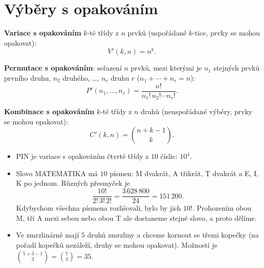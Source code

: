 \section{Výběry s opakováním}\label{sec:vybery-s-opakovanim}

\begin{definitionbox}
  \textbf{Variace s opakováním} $k$-té třídy z $n$ prvků (uspořádané $k$-tice, prvky se mohou opakovat):
  \begin{equation*}
    V'(k, n) = n^k.
  \end{equation*}

  \textbf{Permutace s opakováním}: seřazení $n$ prvků, mezi kterými je $n_1$ stejných prvků prvního druhu, $n_2$ druhého, \ldots, $n_r$ druhu $r$ ($n_1 + \cdots + n_r = n$):
  \begin{equation*}
    P'(n_1, \ldots, n_r) = \frac{n!}{n_1!\,n_2!\cdots n_r!}.
  \end{equation*}

  \textbf{Kombinace s opakováním} $k$-té třídy z $n$ druhů (neuspořádané výběry, prvky se mohou opakovat):
  \begin{equation*}
    C'(k, n) = \binom{n + k - 1}{k}.
  \end{equation*}
\end{definitionbox}

\begin{example}
  \begin{itemize}
    \item PIN je variace s opakováním čtvrté třídy z $10$ číslic: $10^4$.
    \item Slovo MATEMATIKA má $10$ písmen: M dvakrát, A třikrát, T dvakrát a E, I, K po jednom. Různých přesmyček je
    \begin{equation*}
      \frac{10!}{2!\,3!\,2!} = \frac{3\,628\,800}{24} = 151\,200.
    \end{equation*}
    Kdybychom všechna písmena rozlišovali, bylo by jich $10!$. Prohozením obou M, tří A mezi sebou nebo obou T ale dostaneme stejné slovo, a proto dělíme.
    \item Ve zmrzlinárně mají $5$ druhů zmrzliny a chceme kornout se třemi kopečky (na pořadí kopečků nezáleží, druhy se mohou opakovat). Možností je $\binom{5 + 3 - 1}{3} = \binom{7}{3} = 35$.
  \end{itemize}
\end{example}


